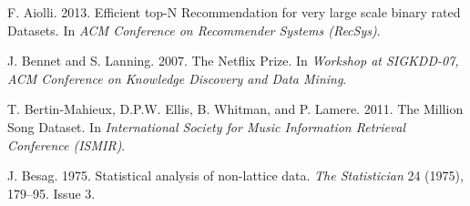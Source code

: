 \documentclass[sigconf]{acmart}
\begin{document}

\begin{thebibliography}{26}



\ifx \showCODEN    \undefined {}     \fi
\ifx \showDOI      \undefined \def \showDOI       #1{#1}\fi
\ifx \showISBNx    \undefined \def \showISBNx     #1{\unskip}     \fi
\ifx \showISBNxiii \undefined \def \showISBNxiii  #1{\unskip}     \fi
\ifx \showISSN     \undefined \def \showISSN      #1{\unskip}     \fi
\ifx \showLCCN     \undefined \def \showLCCN      #1{\unskip}     \fi
\ifx \shownote     \undefined \def \shownote      #1{#1}          \fi
\ifx \showarticletitle \undefined \def \showarticletitle #1{#1}   \fi
\ifx \showURL      \undefined \def \showURL       {\relax}        \fi
\providecommand\bibfield[2]{#2}
\providecommand\bibinfo[2]{#2}
\providecommand\natexlab[1]{#1}
\providecommand\showeprint[2][]{arXiv:#2}

\bibfield{author}{\bibinfo{person}{F. Aiolli}.}
  \bibinfo{year}{2013}\natexlab{}.
\newblock \showarticletitle{Efficient top-N Recommendation for very large scale
  binary rated Datasets}. In \bibinfo{booktitle}{\emph{ACM Conference on
  Recommender Systems (RecSys)}}.
\newblock


\bibfield{author}{\bibinfo{person}{J. Bennet} {and} \bibinfo{person}{S.
  Lanning}.} \bibinfo{year}{2007}\natexlab{}.
\newblock \showarticletitle{The {N}etflix {P}rize}. In
  \bibinfo{booktitle}{\emph{Workshop at SIGKDD-07, ACM Conference on Knowledge
  Discovery and Data Mining}}.
\newblock


\bibfield{author}{\bibinfo{person}{T. Bertin-Mahieux}, \bibinfo{person}{D.P.W.
  Ellis}, \bibinfo{person}{B. Whitman}, {and} \bibinfo{person}{P. Lamere}.}
  \bibinfo{year}{2011}\natexlab{}.
\newblock \showarticletitle{The Million Song Dataset}. In
  \bibinfo{booktitle}{\emph{International Society for Music Information
  Retrieval Conference (ISMIR)}}.
\newblock


\bibfield{author}{\bibinfo{person}{J. Besag}.} \bibinfo{year}{1975}\natexlab{}.
\newblock \showarticletitle{Statistical analysis of non-lattice data}.
\newblock \bibinfo{journal}{\emph{The Statistician}}  \bibinfo{volume}{24}
  (\bibinfo{year}{1975}), \bibinfo{pages}{179--95}.
\newblock
Issue 3.



\end{thebibliography}
\end{document}
